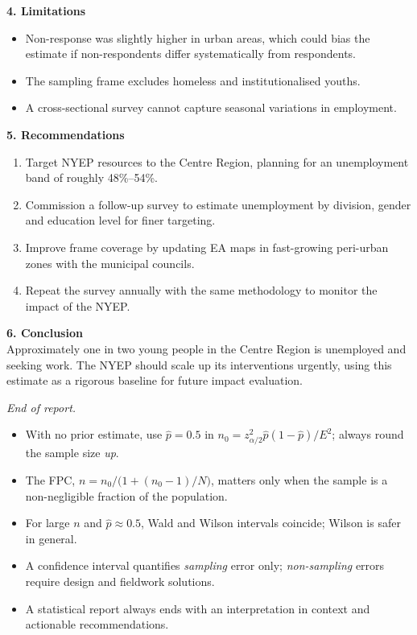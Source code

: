 \documentclass[11pt]{article}
\begin{document}
\textbf{4. Limitations}
\begin{itemize}
    \item Non-response was slightly higher in urban areas, which could bias the estimate if non-respondents differ systematically from respondents.
    \item The sampling frame excludes homeless and institutionalised youths.
    \item A cross-sectional survey cannot capture seasonal variations in employment.
\end{itemize}

\textbf{5. Recommendations}
\begin{enumerate}
    \item Target NYEP resources to the Centre Region, planning for an unemployment band of roughly 48\%--54\%.
    \item Commission a follow-up survey to estimate unemployment by division, gender and education level for finer targeting.
    \item Improve frame coverage by updating EA maps in fast-growing peri-urban zones with the municipal councils.
    \item Repeat the survey annually with the same methodology to monitor the impact of the NYEP.
\end{enumerate}

\textbf{6. Conclusion}\\
Approximately one in two young people in the Centre Region is unemployed and seeking work. The NYEP should scale up its interventions urgently, using this estimate as a rigorous baseline for future impact evaluation.

\emph{End of report.}

\begin{aretenir}
\begin{itemize}
    \item With no prior estimate, use $\hat{p}=0.5$ in $n_0 = z_{\alpha/2}^2\hat{p}(1-\hat{p})/E^2$; always round the sample size \emph{up}.
    \item The FPC, $n = n_0/\bigl(1+(n_0-1)/N\bigr)$, matters only when the sample is a non-negligible fraction of the population.
    \item For large $n$ and $\hat{p}\approx 0.5$, Wald and Wilson intervals coincide; Wilson is safer in general.
    \item A confidence interval quantifies \emph{sampling} error only; \emph{non-sampling} errors require design and fieldwork solutions.
    \item A statistical report always ends with an interpretation in context and actionable recommendations.
\end{itemize}
\end{aretenir}
\end{document}
